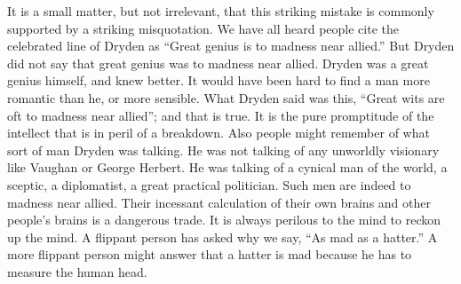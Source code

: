 It is a small matter, but not irrelevant, that this striking mistake is commonly supported by a striking misquotation. We have all heard people cite the celebrated line of Dryden as “Great genius is to madness near allied.” But Dryden did not say that great genius was to madness near allied. Dryden was a great genius himself, and knew better. It would have been hard to find a man more romantic than he, or more sensible. What Dryden said was this, “Great wits are oft to madness near allied”; and that is true. It is the pure promptitude of the intellect that is in peril of a breakdown. Also people might remember of what sort of man Dryden was talking. He was not talking of any unworldly visionary like Vaughan or George Herbert. He was talking of a cynical man of the world, a sceptic, a diplomatist, a great practical politician. Such men are indeed to madness near allied. Their incessant calculation of their own brains and other people’s brains is a dangerous trade. It is always perilous to the mind to reckon up the mind. A flippant person has asked why we say, “As mad as a hatter.” A more flippant person might answer that a hatter is mad because he has to measure the human head.


